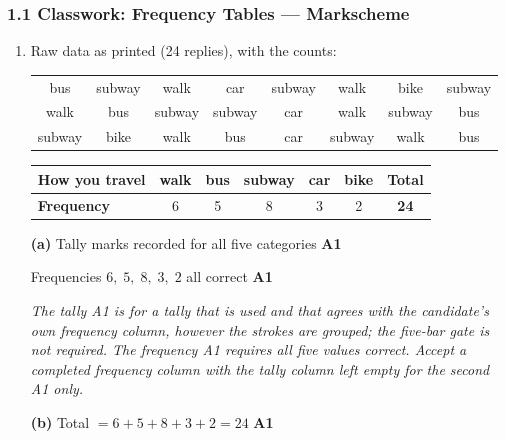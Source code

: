\documentclass[12pt, twoside]{article}
\begin{document}
\subsubsection*{1.1 Classwork: Frequency Tables --- Markscheme}

\begin{enumerate}[itemsep=0.3cm]

\item[1.] [Maximum mark: 6]

Raw data as printed (24 replies), with the counts:

{\small
\begin{center}
\setlength{\tabcolsep}{4pt}
\begin{tabular}{cccccccc}
bus & subway & walk & car & subway & walk & bike & subway \\
walk & bus & subway & subway & car & walk & subway & bus \\
subway & bike & walk & bus & car & subway & walk & bus \\
\end{tabular}
\end{center}}

\vspace{-0.2cm}

{\renewcommand{\arraystretch}{1.3}
\begin{center}
\begin{tabular}{|l|c|c|c|c|c|c|}
\hline
\textbf{How you travel} & walk & bus & subway & car & bike & \textbf{Total} \\ \hline
\textbf{Frequency} & 6 & 5 & 8 & 3 & 2 & \textbf{24} \\ \hline
\end{tabular}
\end{center}}

\textbf{(a)} Tally marks recorded for all five categories
\hfill \textbf{A1}

Frequencies $6,\; 5,\; 8,\; 3,\; 2$ all correct \hfill \textbf{A1}

\emph{The tally A1 is for a tally that is used and that agrees with the
candidate's own frequency column, however the strokes are grouped; the
five-bar gate is not required. The frequency A1 requires all five values
correct. Accept a completed frequency column with the tally column left
empty for the second A1 only.}

\textbf{(b)} Total $= 6 + 5 + 8 + 3 + 2 = 24$ \hfill \textbf{A1}


\end{enumerate}
\end{document}
